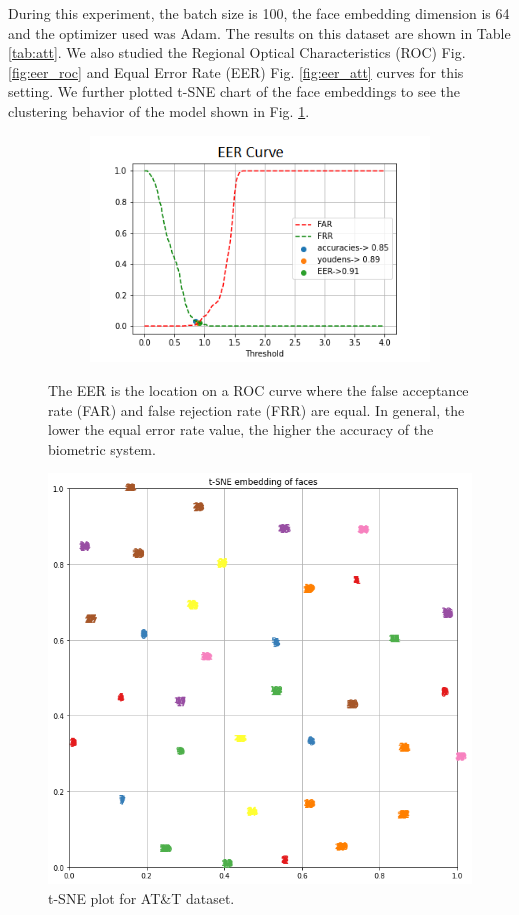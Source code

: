 \documentclass[aps,prb,twocolumn,superscriptaddress,floatfix,longbibliography, nofootinbib]{revtex4-2}
\newif\ifptitle
\newif\ifpnumber
\newcounter{para}
\newcommand\ptitle[1]{\par\refstepcounter{para}
{\ifpnumber{\noindent\textcolor{lightgray}{\textbf{\thepara}}\indent}\fi}
{\ifptitle{\textbf{[{#1}]}}\fi}}
\begin{document}
\ptitle{Outcome}
During this experiment, the batch size is 100, the face embedding dimension is 64 and the optimizer used was Adam. The results on this dataset are shown in Table \ref{tab:att}. We also studied the Regional Optical Characteristics (ROC) Fig. \ref{fig:eer_roc} and Equal Error Rate (EER) Fig. \ref{fig:eer_att} curves for this setting. We further plotted t-SNE chart of the face embeddings to see the clustering behavior of the model shown in Fig. \ref{fig:tsne_att}.

\begin{figure}[t!]
    \begin{minipage}[b]{0.45\linewidth}
    \centering
    \includegraphics[clip=true,width=1.1\textwidth, height=6cm]{EER_ATT_testdataset.png}
    \caption{The EER is the location on a ROC curve where the false acceptance rate (FAR) and false rejection rate (FRR) are equal. In general, the lower the equal error rate value, the higher the accuracy of the biometric system.}
     \label{fig:eer_att}
     \end{minipage}
     \hspace{0.5cm}
    \begin{minipage}[b]{0.45\linewidth}
    \centering
    \includegraphics[clip=true,width=\textwidth]{tSNE_embds_ATT_train.png}
    \caption{t-SNE plot for AT\&T dataset.}
    \label{fig:tsne_att}
    \end{minipage}
\end{figure}
\end{document}
